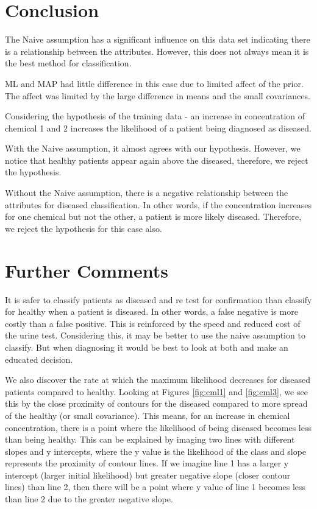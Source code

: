 {{\section{Conclusion}
The Naive assumption has a significant influence on this data set indicating there is a relationship between the attributes. However, this does not always mean it is the best method for classification. 

ML and MAP had little difference in this case due to limited affect of the prior. The affect was limited by the large difference in means and the small covariances.

Considering the hypothesis of the training data - an increase in concentration of chemical 1 and 2 increases the likelihood of a patient being diagnosed as diseased. 

With the Naive assumption, it almost agrees with our hypothesis. However, we notice that healthy patients appear again above the diseased, therefore, we reject the hypothesis.

Without the Naive assumption, there is a negative relationship between the attributes for diseased classification. In other words, if the concentration increases for one chemical but not the other, a patient is more likely diseased. Therefore, we reject the hypothesis for this case also.

\section{Further Comments}
It is safer to classify patients as diseased  and re test for confirmation than classify for healthy when a patient is diseased. In other words, a false negative is more costly than a false positive. This is reinforced by the speed and reduced cost of the urine test. Considering this, it may be better to use the naive assumption to classify. But when diagnosing it would be best to look at both and make an educated decision.

We also discover the rate at which the maximum likelihood decreases for diseased patients compared to healthy. Looking at Figures \ref{fig:cml1} and \ref{fig:cml3}, we see this by the close proximity of contours for the diseased compared to more spread of the healthy (or small covariance). This means, for an increase in chemical concentration, there is a point where the likelihood of being diseased becomes less than being healthy. This can be explained by imaging two lines with different slopes and y intercepts, where the y value is the likelihood of the class and slope represents the proximity of contour lines. If we imagine line 1 has a larger y intercept (larger initial likelihood) but greater negative slope (closer contour lines) than line 2, then there will be a point where y value of line 1 becomes less than line 2 due to the greater negative slope. 

}}
